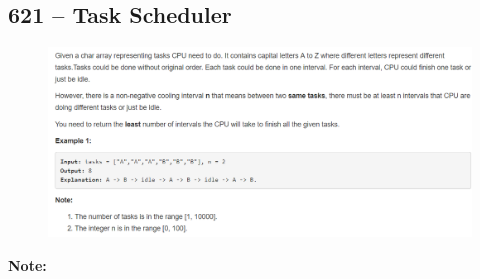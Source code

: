 \documentclass[a4paper,12pt]{article}
\begin{document}
\subsection{621 -- Task Scheduler}
\begin{figure}[H]
	\begin{center}
		\includegraphics[width=18cm]{621.png}
	\end{center}
\end{figure}
\textbf{\large{Note:}}
\par
\vspace{0.5em}
\noindent
\end{document}
